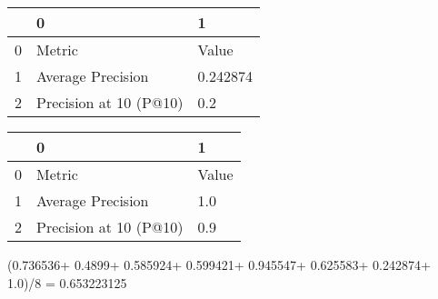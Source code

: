 \begin{tabular}{lll}
\toprule
{} &                       0 &         1 \\
\midrule
0 &                  Metric &     Value \\
1 &       Average Precision &  0.242874 \\
2 &  Precision at 10 (P@10) &       0.2 \\
\bottomrule
\end{tabular}

\begin{tabular}{lll}
\toprule
{} &                       0 &      1 \\
\midrule
0 &                  Metric &  Value \\
1 &       Average Precision &    1.0 \\
2 &  Precision at 10 (P@10) &    0.9 \\
\bottomrule
\end{tabular}

(0.736536+
0.4899+
0.585924+
0.599421+
0.945547+
0.625583+
0.242874+
1.0)/8 = 0.653223125